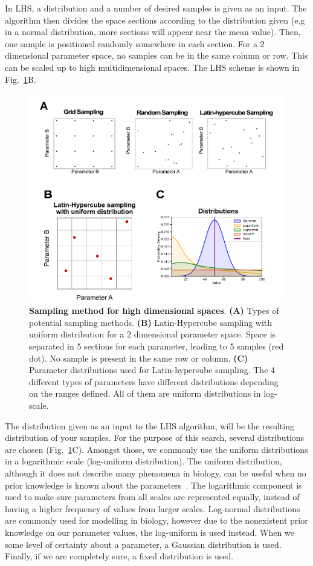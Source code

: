 In LHS, a distribution and a number of desired samples is given as an input.
The algorithm then divides the space sections according to the distribution given (e.g in a normal distribution, more sections will appear near the mean value).
Then, one sample is positioned randomly somewhere in each section.
For a 2 dimensional parameter space, no samples can be in the same column or row.
This can be scaled up to high multidimensional spaces.
The LHS scheme is shown in Fig.~\ref{fig:distributions}B.
\begin{figure}[H]

    \includegraphics[width=1\textwidth]{chapters/Methods/distributions}
    \caption{\textbf{Sampling method for high dimensional spaces}. \textbf{(A)} Types of potential sampling methods. \textbf{(B)} Latin-Hypercube sampling with uniform distribution for a 2 dimensional parameter space. Space is separated in 5 sections for each parameter, leading to 5 samples (red dot). No sample is present in the same row or column. \textbf{(C)} Parameter distributions used for Latin-hypersube sampling. The 4 different types of parameters have different distributions depending on the ranges defined. All of them are uniform distributions in log-scale.}
    \label{fig:distributions}
\end{figure}
The distribution given as an input to the LHS algorithm, will be the resulting distribution of your samples.
For the purpose of this search, several distributions are chosen (Fig.~\ref{fig:distributions}C).
Amongst those, we commonly use the uniform distributions in a logarithmic scale (log-uniform distribution).
The uniform distribution, although it does not describe many phenomena in biology, can be useful when no prior knowledge is known about the parameters~\parencite{Frank2009}.
The logarithmic component is used to make sure parameters from all scales are represented equally, instead of having a higher frequency of values from larger scales.
Log-normal distributions are commonly used for modelling in biology, however due to the nonexistent prior knowledge on our parameter values, the log-uniform is used instead.
When we some level of certainty about a parameter, a Gaussian distribution is used.
Finally, if we are completely sure, a fixed distribution is used.
